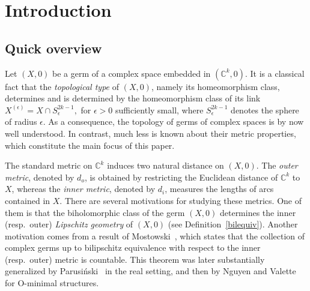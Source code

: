 \documentclass[reqno,dvipsnames,12pt]{amsart}
\begin{document}
\begin{abstract}
Hence it suffices to work in the non-pinched case. There, we construct the complete invariant mentioned in the beginning of the abstract in term of the function $\mathcal{I}_F$. The key step is that $(\overline{X},0)$, endowed with the pullback of the Euclidean metric of $(\mathbb{C}^k,0)$ via $n$, is bilipschitz equivalent to an explicitly constructed complex surface germ with isolated singularities, equipped with its natural inner metric.
\end{abstract}





\section*{Introduction}


\subsection*{Quick overview}
Let $(X,0)$ be a germ of a complex space embedded in $(\mathbb{C}^k,0)$. It is a classical fact that the \textit{topological type} of $(X,0)$, namely its homeomorphism class, determines and is  determined by the homeomorphism class of its link $X^{(\epsilon)} = X \cap S^{2k-1}_{\epsilon},$ for $\epsilon > 0$ sufficiently small, where $S^{2k-1}_{\epsilon}$ denotes the sphere of radius $\epsilon$. As a consequence, the topology of germs of complex spaces is by now well understood. In contrast, much less is known about their metric properties, which constitute the main focus of this paper.






The standard metric on $\mathbb{C}^k$ induces two natural distance  on $(X,0)$. The \textit{outer metric}, denoted by $d_o$, is obtained by restricting the Euclidean distance of $\mathbb{C}^k$ to $X$, whereas the \textit{inner metric}, denoted by $d_i$, measures the lengths of arcs contained in $X$. There are several motivations for studying these metrics. One of them is that the biholomorphic class of the germ $(X,0)$ determines the inner (resp.\ outer) \textit{Lipschitz geometry} of $(X,0)$ (see Definition~\ref{bilequiv}). Another motivation comes from a result of Mostowski~\cite{Mostowski1985a}, which states that the collection of complex germs up to bilipschitz equivalence with respect to the inner (resp.\ outer) metric is countable. This theorem was later substantially generalized by Parusi\'nski~\cite{parulipschitz2} in the real setting, and then by Nguyen and Valette~\cite{valette1} for O-minimal structures. 
 
\end{document}

